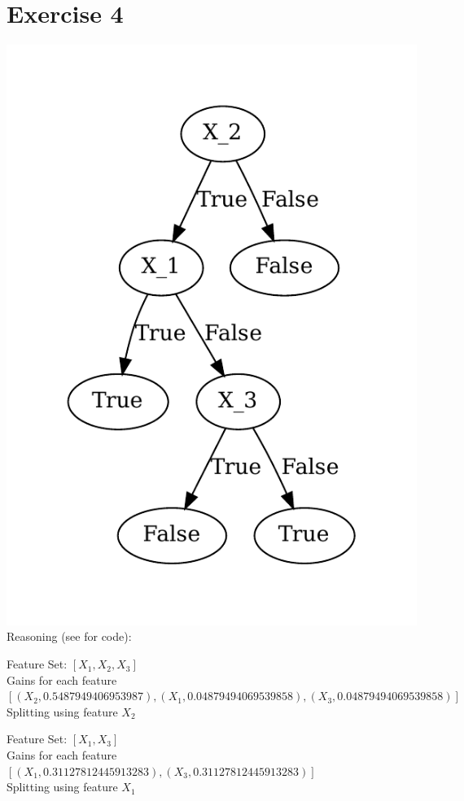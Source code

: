 \documentclass[12pt]{article}
\begin{document}
\section*{Exercise 4}
\includegraphics{code/Decision-Tree.gv.pdf} \\
Reasoning (see  for code):
\bigskip

Feature Set: $[X_1, X_2, X_3]$ \\
Gains for each feature $[(X_2, 0.5487949406953987), (X_1, 0.04879494069539858), (X_3, 0.04879494069539858)]$ \\
Splitting using feature $X_2$
\bigskip

Feature Set: $[X_1, X_3]$ \\
Gains for each feature $[(X_1, 0.31127812445913283), (X_3, 0.31127812445913283)]$ \\
Splitting using feature $X_1$
\bigskip
\end{document}

